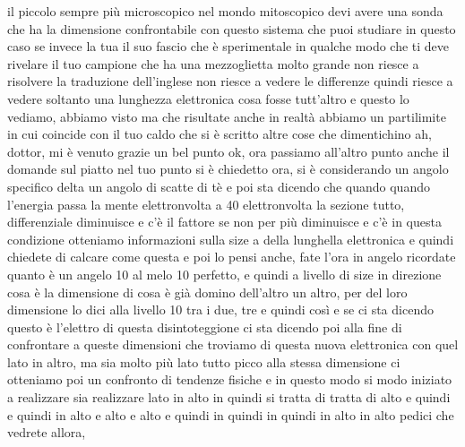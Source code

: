 \begin{soluzione}
{   il piccolo sempre più microscopico nel mondo mitoscopico devi avere una sonda che ha la dimensione confrontabile con questo sistema che puoi studiare in questo caso se invece la tua il suo fascio che è sperimentale in qualche modo che ti deve rivelare il tuo campione che ha una mezzoglietta molto grande non riesce a risolvere la traduzione dell'inglese non riesce a vedere le differenze quindi riesce a vedere soltanto una lunghezza elettronica cosa fosse tutt'altro e questo lo vediamo, abbiamo visto ma che risultate anche in realtà abbiamo un partilimite in cui coincide con il tuo caldo che si è scritto altre cose che dimentichino ah, dottor, mi è venuto grazie un bel punto ok, ora passiamo all'altro punto anche il domande sul piatto nel tuo punto si è chiedetto ora, si è considerando un angolo specifico delta un angolo di scatte di tè e poi sta dicendo che quando quando l'energia passa la mente elettronvolta a 40 elettronvolta la sezione tutto, differenziale diminuisce e c'è il fattore se non per più diminuisce e c'è in questa condizione otteniamo informazioni sulla size a della lunghella elettronica e quindi chiedete di calcare come questa e poi lo pensi anche, fate l'ora in angelo ricordate quanto è un angelo 10 al melo 10 perfetto, e quindi a livello di size in direzione cosa è la dimensione di cosa è già domino dell'altro un altro, per del loro dimensione lo dici alla livello 10 tra i due, tre e quindi così e se ci sta dicendo questo è l'elettro di questa disintoteggione ci sta dicendo poi alla fine di confrontare a queste dimensioni che troviamo di questa nuova elettronica con quel lato in altro, ma sia molto più lato tutto picco alla stessa dimensione ci otteniamo poi un confronto di tendenze fisiche e in questo modo si modo iniziato a realizzare sia realizzare lato in alto in quindi si tratta di tratta di alto e quindi e quindi in alto e alto e alto e quindi in quindi in quindi in alto in alto pedici che vedrete allora,
   
}
\end{soluzione}
